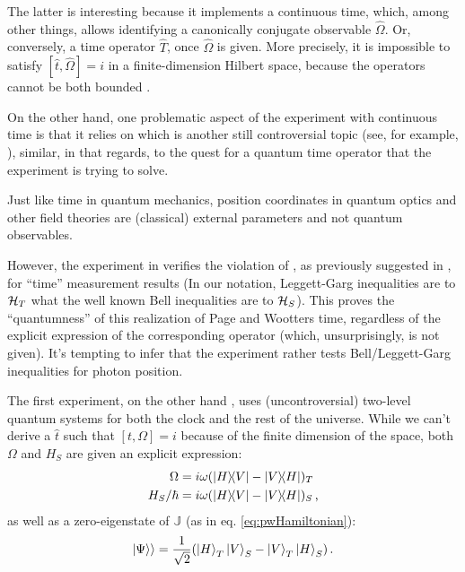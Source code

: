 The latter is interesting because it implements a continuous time,
which, among other things, allows identifying a canonically conjugate observable
$\hat{\Omega}$. Or, conversely, a time operator $\hat{T}$, once $\hat{\Omega}$ is given.
More precisely, it is impossible to satisfy $[\hat{t}, \hat{\Omega}] = i$
in a finite-dimension Hilbert space, because the operators
cannot be both bounded \parencite{Weyl1927}.

On the other hand, one problematic aspect of the experiment with continuous time
is that
it relies on  which is another
still controversial topic (see, for example, \cite{HawtonPhotonPosition}),
similar, in that regards, to the quest for a quantum time operator that the experiment is trying to solve.

Just like time in quantum mechanics, position coordinates in quantum optics and other field theories
are (classical) external parameters and not quantum observables. 

However, the experiment in \cite{Moreva_position} verifies the violation of
, as previously suggested in \cite{LeggettGarg+PageWootters},
for ``time'' measurement results
(In our notation, Leggett-Garg inequalities are to $\mathcal{H}_T$ what the well known Bell inequalities
  are to $\mathcal{H}_S$).
This proves the ``quantumness'' of this realization of Page and Wootters time,
regardless of the explicit expression of the corresponding operator (which, unsurprisingly,
is not given). It's tempting to infer that the experiment
rather tests Bell/Leggett-Garg inequalities for photon position.

The first experiment, on the other hand \parencite{Moreva:illustration,Moreva:synthetic},
uses (uncontroversial)
two-level quantum systems for both the clock and the rest of the universe.
While we can't derive a $\hat{t}$ such that $[t, \Omega] = i$
because of the finite dimension of the space, both $\Omega$
and $H_S$ are given an explicit expression:
\begin{align}
  \Omega            &= i\omega(\ketbra{H}{V}- \ketbra{V}{H})_T \\
  H_S/{\hbar}       &= i\omega(\ketbra{H}{V}- \ketbra{V}{H})_S
  \,\text{,}
\end{align} 
as well as a zero-eigenstate of $\mathbb{J}$ (as in eq. \ref{eq:pwHamiltonian}):
\begin{equation}
  |\Psi\rangle\rangle = \frac{1}{\sqrt{2}}\qty(\ket{H}_T\ket{V}_S-\ket{V}_T\ket{H}_S)
  \,\text{.}
\end{equation}


